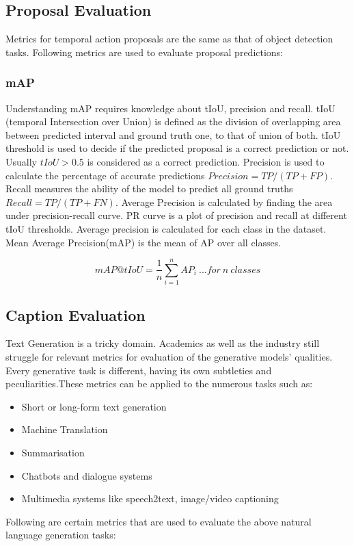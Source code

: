 \subsection{Proposal Evaluation}
Metrics for temporal action proposals are the same as that of object detection tasks. Following metrics are used to evaluate proposal predictions:

\subsubsection{mAP}
Understanding mAP requires knowledge about tIoU, precision and recall. tIoU (temporal Intersection over Union) is defined as the division of overlapping area between predicted interval and ground truth one, to that of union of both. tIoU threshold is used to decide if the predicted proposal is a correct prediction or not. Usually $tIoU > 0.5$ is considered as a correct prediction. Precision is used to calculate the percentage of accurate predictions $Precision = TP / (TP + FP)$. Recall measures the ability of the model to predict all ground truths $Recall = TP / (TP + FN)$. Average Precision is calculated by finding the area under precision-recall curve. PR curve is a plot of precision and recall at different tIoU thresholds. Average precision is calculated for each class in the dataset. Mean Average Precision(mAP) is the mean of AP over all classes. 

$$ mAP@tIoU = \frac{1}{n}\displaystyle\sum\limits_{i=1}^n AP_i \ ...for\ n\ classes $$

\subsection{Caption Evaluation}
Text Generation is a tricky domain. Academics as well as the industry still struggle for relevant metrics for evaluation of the generative models' qualities. Every generative task is different, having its own subtleties and peculiarities.These metrics can be applied to the numerous tasks such as:
\begin{itemize}
	\item Short or long-form text generation
	\item Machine Translation
	\item Summarisation
	\item Chatbots and dialogue systems
	\item Multimedia systems like speech2text, image/video captioning
\end{itemize}
Following are certain metrics that are used to evaluate the above natural language generation tasks:

